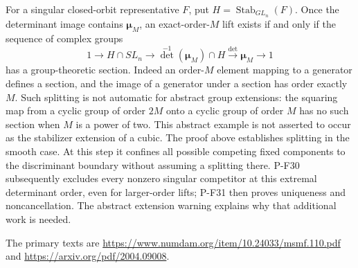 For a singular closed-orbit representative $F$, put
$H=\operatorname{Stab}_{GL_n}(F)$. Once the determinant image
contains $\boldsymbol\mu_M$, an exact-order-$M$ lift exists
if and only if the sequence of complex groups
\[
 1\longrightarrow H\cap SL_n\longrightarrow
   \det^{-1}(\boldsymbol\mu_M)\cap H
   \xrightarrow{\det}\boldsymbol\mu_M\longrightarrow1
 \tag{P-F26g}
\]
has a group-theoretic section. Indeed an order-$M$ element
mapping to a generator defines a section, and the image
of a generator under a section has order exactly $M$.
Such splitting is not automatic for abstract group extensions:
the squaring map from a cyclic group of order $2M$ onto a
cyclic group of order $M$ has no such section when $M$ is a
power of two. This abstract example is not asserted to occur
as the stabilizer extension of a cubic. The proof above
establishes splitting in the smooth case. At this step it
confines all possible competing fixed components to the
discriminant boundary without assuming a splitting there.
P-F30 subsequently excludes every nonzero singular competitor
at this extremal determinant order, even for larger-order lifts;
P-F31 then proves uniqueness and noncancellation. The abstract
extension warning explains why that additional work is needed.

The primary texts are
\url{https://www.numdam.org/item/10.24033/msmf.110.pdf}
and \url{https://arxiv.org/pdf/2004.09008}.
